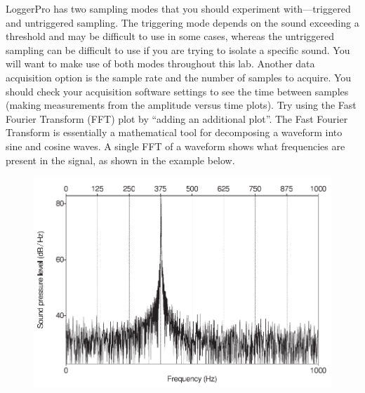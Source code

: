 \documentclass[11pt,letterpaper]{article}
\begin{document}
LoggerPro has two sampling modes that you should experiment with---triggered and untriggered sampling. The triggering mode depends on the sound exceeding a threshold and may be difficult to use in some cases, whereas the untriggered sampling can be difficult to use if you are trying to isolate a specific sound. You will want to make use of both modes throughout this lab. Another data acquisition option is the sample rate and the number of samples to acquire. You should check your acquisition software settings to see the time between samples (making measurements from the amplitude versus time plots). Try using the Fast Fourier Transform (FFT) plot by ``adding an additional plot''. The Fast Fourier Transform is essentially a mathematical tool for decomposing a waveform into sine and cosine waves. A single FFT of a waveform shows what frequencies are present in the signal, as shown in the example below.

\begin{figure}[h]
\begin{center}
\includegraphics[]{./fft_zoom}
\end{center}
\end{figure}
\end{document}
